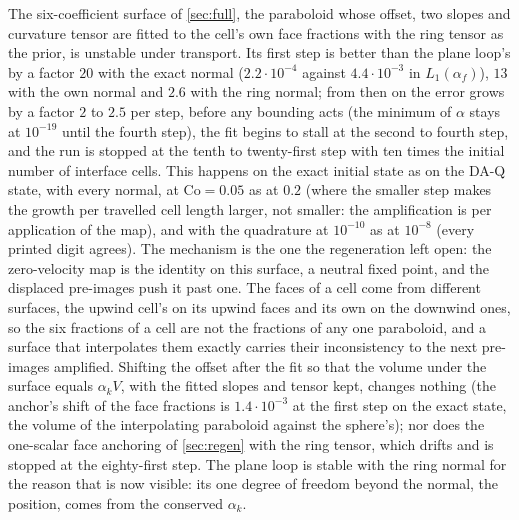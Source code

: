 \documentclass[preprint,12pt]{elsarticle}
\begin{document}
The six-coefficient surface of \cref{sec:full}, the paraboloid whose offset, two slopes and curvature tensor are fitted to the cell's own face fractions with the ring tensor as the prior, is unstable under transport. Its first step is better than the plane loop's by a factor $20$ with the exact normal ($2.2\cdot10^{-4}$ against $4.4\cdot10^{-3}$ in $L_1(\alpha_f)$), $13$ with the own normal and $2.6$ with the ring normal; from then on the error grows by a factor $2$ to $2.5$ per step, before any bounding acts (the minimum of $\alpha$ stays at $10^{-19}$ until the fourth step), the fit begins to stall at the second to fourth step, and the run is stopped at the tenth to twenty-first step with ten times the initial number of interface cells. This happens on the exact initial state as on the DA-Q state, with every normal, at $\mathrm{Co} = 0.05$ as at $0.2$ (where the smaller step makes the growth per travelled cell length larger, not smaller: the amplification is per application of the map), and with the quadrature at $10^{-10}$ as at $10^{-8}$ (every printed digit agrees). The mechanism is the one the regeneration left open: the zero-velocity map is the identity on this surface, a neutral fixed point, and the displaced pre-images push it past one. The faces of a cell come from different surfaces, the upwind cell's on its upwind faces and its own on the downwind ones, so the six fractions of a cell are not the fractions of any one paraboloid, and a surface that interpolates them exactly carries their inconsistency to the next pre-images amplified. Shifting the offset after the fit so that the volume under the surface equals $\alpha_k V$, with the fitted slopes and tensor kept, changes nothing (the anchor's shift of the face fractions is $1.4\cdot10^{-3}$ at the first step on the exact state, the volume of the interpolating paraboloid against the sphere's); nor does the one-scalar face anchoring of \cref{sec:regen} with the ring tensor, which drifts and is stopped at the eighty-first step. The plane loop is stable with the ring normal for the reason that is now visible: its one degree of freedom beyond the normal, the position, comes from the conserved $\alpha_k$.
\end{document}
